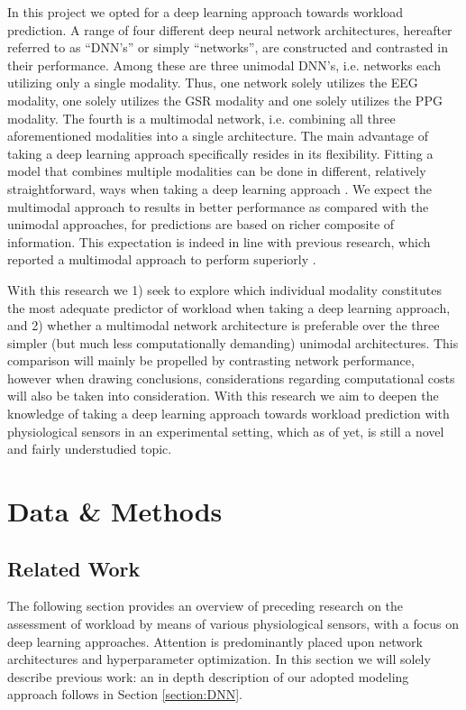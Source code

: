 \documentclass[fleqn,11pt]{paper}
\begin{document}
In this project we opted for a deep learning approach towards workload prediction. A range of four different deep neural network architectures, hereafter referred to as \enquote{DNN's} or simply \enquote{networks},  are constructed and contrasted in their performance. Among these are three unimodal DNN's, i.e. networks each utilizing only a single modality. Thus,  one network solely utilizes the EEG modality,  one solely utilizes the GSR modality and one solely utilizes the PPG modality. The fourth is a multimodal network, i.e. combining all three aforementioned modalities into a single architecture. The main advantage of taking a deep learning approach specifically resides in its flexibility. Fitting a model that combines multiple modalities can be done in different, relatively straightforward, ways when taking a deep learning approach \cite{ramachandram2017deep}. We expect the multimodal approach to results in better performance as compared with the unimodal approaches, for predictions are based on richer composite of information. This expectation is indeed in line with previous research, which reported a multimodal approach to perform superiorly \cite{dolmans2020perceived, han2020classification,rastgoo2019automatic, yin2017recognition}.

With this research we 1) seek to explore which individual modality constitutes the most adequate predictor of workload when taking a deep learning approach, and 2) whether a multimodal network architecture is preferable over the three simpler (but much less computationally demanding) unimodal architectures. This comparison will mainly be propelled by contrasting network performance, however when drawing conclusions, considerations regarding computational costs will also be taken into consideration. With this research we aim to deepen the knowledge of taking a deep learning approach towards workload prediction with physiological sensors in an experimental setting, which as of yet, is still a novel and fairly understudied topic. 

\vspace{10mm}
\section{Data \& Methods}
\subsection{Related Work} \label{sec:related}
The following section provides an overview of preceding research on the assessment of workload by means of various physiological sensors, with a focus on deep learning approaches. Attention is predominantly placed upon network architectures and hyperparameter optimization. In this section we will solely describe previous work: an in depth description of our adopted modeling approach follows in Section \ref{section:DNN}.
\end{document}
